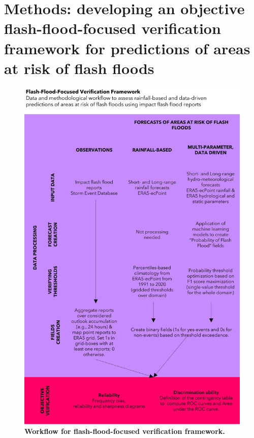\section{Methods: developing an objective flash-flood-focused 
verification framework for predictions of areas at risk of flash floods}
\label{flash_flood_focused_verification_rainfall_based_ff_METHODS}

\begin{figure}[htbp]
\centering
\includegraphics[width=\textwidth]{workflow_verif_framework.png}
\caption{\textbf{Workflow for flash-flood-focused verification framework.}}
\label{fig:workflow_verif_framework}
\end{figure}

